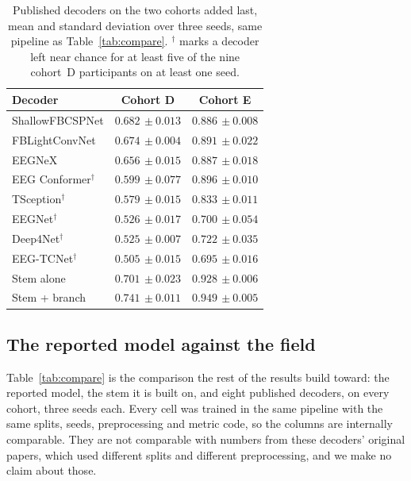 \documentclass[a4paper,fleqn]{cas-dc}
\begin{document}
\begin{table}[t]
\centering
\caption{Published decoders on the two cohorts added last, mean and standard deviation over three seeds, same pipeline as Table~\ref{tab:compare}. $^{\dagger}$ marks a decoder left near chance for at least five of the nine cohort~D participants on at least one seed.}
\label{tab:newbase}
\begin{tabular}{lcc}
\hline
Decoder & Cohort D & Cohort E \\
\hline
ShallowFBCSPNet & $0.682{\scriptstyle\,{\pm}0.013}$ & $0.886{\scriptstyle\,{\pm}0.008}$ \\
FBLightConvNet & $0.674{\scriptstyle\,{\pm}0.004}$ & $0.891{\scriptstyle\,{\pm}0.022}$ \\
EEGNeX & $0.656{\scriptstyle\,{\pm}0.015}$ & $0.887{\scriptstyle\,{\pm}0.018}$ \\
EEG Conformer$^{\dagger}$ & $0.599{\scriptstyle\,{\pm}0.077}$ & $0.896{\scriptstyle\,{\pm}0.010}$ \\
TSception$^{\dagger}$ & $0.579{\scriptstyle\,{\pm}0.015}$ & $0.833{\scriptstyle\,{\pm}0.011}$ \\
EEGNet$^{\dagger}$ & $0.526{\scriptstyle\,{\pm}0.017}$ & $0.700{\scriptstyle\,{\pm}0.054}$ \\
Deep4Net$^{\dagger}$ & $0.525{\scriptstyle\,{\pm}0.007}$ & $0.722{\scriptstyle\,{\pm}0.035}$ \\
EEG-TCNet$^{\dagger}$ & $0.505{\scriptstyle\,{\pm}0.015}$ & $0.695{\scriptstyle\,{\pm}0.016}$ \\
\hline
Stem alone & $0.701{\scriptstyle\,{\pm}0.023}$ & $0.928{\scriptstyle\,{\pm}0.006}$ \\
Stem + branch & $\mathbf{0.741}{\scriptstyle\,{\pm}0.011}$ & $\mathbf{0.949}{\scriptstyle\,{\pm}0.005}$ \\
\end{tabular}
\end{table}

\subsection{The reported model against the field}
\label{sec:master}

Table~\ref{tab:compare} is the comparison the rest of the results build toward: the reported model, the stem it is built on, and eight published decoders, on every cohort, three seeds each. Every cell was trained in the same pipeline with the same splits, seeds, preprocessing and metric code, so the columns are internally comparable. They are not comparable with numbers from these decoders' original papers, which used different splits and different preprocessing, and we make no claim about those.
\end{document}

